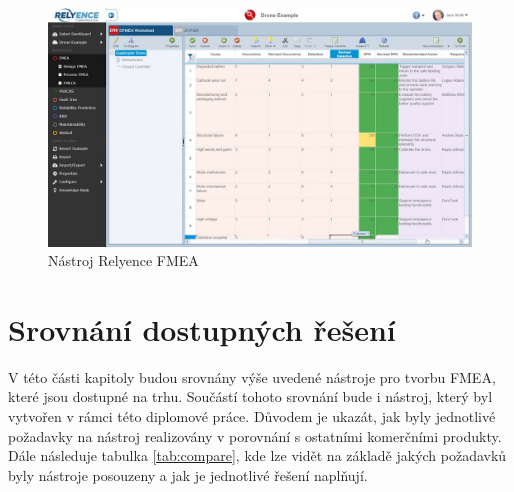 \begin{figure}[h]
\centering
	\includegraphics[width=1.0\textwidth]{Figures/relyence.jpg}
	\caption{Nástroj Relyence FMEA }
	\label{fig:relyence}
\end{figure}

\section{Srovnání dostupných řešení}
V této části kapitoly budou srovnány výše uvedené nástroje pro tvorbu FMEA, které jsou dostupné na trhu. Součástí tohoto srovnání bude i nástroj, který byl vytvořen v rámci této diplomové práce. Důvodem je ukazát, jak byly jednotlivé požadavky na nástroj realizovány v porovnání s ostatními komerčními produkty. Dále následuje tabulka \ref{tab:compare}, kde lze vidět na základě jakých požadavků byly nástroje posouzeny a jak je jednotlivé řešení naplňují.
\break
\break
\break
\break
\break
\break


